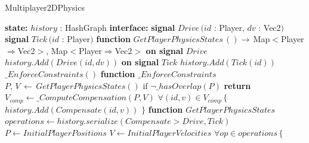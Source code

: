 \documentclass{article}
\begin{document}
\begin{algorithm}
\caption{Multiplayer2DPhysics}
\begin{algorithmic}
\State \textbf{state:}
\State \hspace{\algorithmicindent} $history$ : HashGraph
\State
\State \textbf{interface:}
\State \hspace{\algorithmicindent} \textbf{signal} $Drive\,(id$ : Player$,\,dv$ : Vec2$)$
\State \hspace{\algorithmicindent} \textbf{signal} $Tick\,(id$ : Player$)$
\State \hspace{\algorithmicindent} \textbf{function} $GetPlayerPhysicsStates\,() \rightarrow\, $Map$<$Player$\Rightarrow$Vec2$>$, Map$<$Player$\Rightarrow$Vec2$>$
\State{}
\State
\State \textbf{on signal} $Drive$
\State \hspace{\algorithmicindent} $history.Add(Drive(id,dv))$
\State
\State \textbf{on signal} $Tick$
\State \hspace{\algorithmicindent} $history.Add(Tick(id))$
\State \hspace{\algorithmicindent} $\_EnforceConstraints()$
\State
\State \textbf{function} $\_EnforceConstraints$
\State \hspace{\algorithmicindent} $P,\,V \,\leftarrow\, GetPlayerPhysicsStates()$
\State \hspace{\algorithmicindent} if $\neg \_hasOverlap(P)$ \textbf{return} 
\State \hspace{\algorithmicindent} $V_{comp} \leftarrow \_ComputeCompensation(P,V)$
\State \hspace{\algorithmicindent} $\forall (id,v) \in V_{comp} \,\{$
\State \hspace{\algorithmicindent} \hspace{\algorithmicindent} $history.Add(Compensate(id, v))$
\State \hspace{\algorithmicindent} $\}$
\State
\State \textbf{function} $GetPlayerPhysicsStates$
\State \hspace{\algorithmicindent} $operations \leftarrow history.serialize(Compensate > Drive, Tick)$
\State {}
\State \hspace{\algorithmicindent} $P \leftarrow InitialPlayerPositions$
\State \hspace{\algorithmicindent} $V \leftarrow InitialPlayerVelocities$
\State \hspace{\algorithmicindent} $\forall op \in operations \,\{$

\end{algorithmic}
\end{algorithm}
\end{document}
